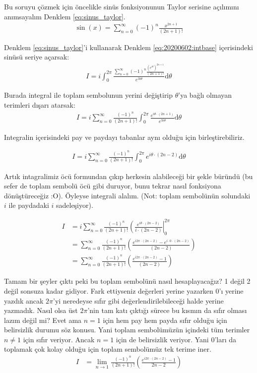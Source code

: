 \documentclass{article}
\numberwithin{equation}{section}
\begin{document}
Bu soruyu çözmek için öncelikle sinüs fonksiyonunun Taylor serisine açılımını anımsayalım Denklem \eqref{eq:sinus_taylor}.
%
\begin{align}
\label{eq:sinus_taylor}
	\sin(x) = \sum_{n=0}^{\infty} (-1)^n \frac{x^{2n+1}}{(2n+1)!}
\end{align}

Denklem \eqref{eq:sinus_taylor}'i kullanarak Denklem \eqref{eq:20200602:intbase} içerisindeki sinüsü seriye açarsak: 
%
\begin{align}
 I = i\int_0^{2\pi} \frac{\sum_{n=0}^{\infty} (-1)^n \frac{(e^{i\theta} )^{2n+1}}{(2n+1)!}}{e^{3i\theta}}  \mathrm{d}\theta
\end{align} 

Burada integral ile toplam sembolunun yerini değiştirip $\theta$'ya bağlı olmayan terimleri dışarı atarsak: 
\begin{align}
I = i \sum_{n=0}^{\infty} \frac{(-1)^n}{(2n+1)!}  \int_0^{2\pi} \frac{ e^{i\theta\cdot (2n+1)} }{e^{3i\theta}}  \mathrm{d}\theta
\end{align} 

Integralin içerisindeki pay ve paydayı tabanlar aynı olduğu için birleştirebiliriz.

\begin{align}
I = i \sum_{n=0}^{\infty} \frac{(-1)^n}{(2n+1)!}  \int_0^{2\pi} e^{i\theta\cdot (2n-2)}  \mathrm{d}\theta
\end{align} 

Artık intagralimiz öcü formundan çıkıp herkesin alabileceği bir şekle büründü (bu sefer de toplam sembolü öcü gibi duruyor, bunu tekrar nasıl fonksiyona dönüştüreceğiz :O). Öyleyse integrali alalım. (Not: toplam sembolünün solundaki $i$ ile paydadaki $i$ sadeleşiyor).

\begin{align}
I &= i\sum_{n=0}^{\infty} \frac{(-1)^n}{(2n+1)!} \left( \frac{ e^{i\theta\cdot (2n-2)}  }{i\cdot (2n-2)}\right|_0^{2\pi} \nonumber \\
&= \sum_{n=0}^{\infty} \frac{(-1)^n}{(2n+1)!} \left( \frac{ e^{i2\pi\cdot (2n-2)} -  e^{i\cdot  0\cdot (2n-2)}  }{(2n-2)}\right) \nonumber \\
&= \sum_{n=0}^{\infty} \frac{(-1)^n}{(2n+1)!} \left( \frac{ e^{i2\pi\cdot (2n-2)} -  1  }{(2n-2)}\right)
\end{align} 

Tamam bir şeyler çıktı peki bu toplam sembolünü nasıl hesaplayacağız? 1 değil 2 değil sonsuza kadar gidiyor. Fark ettiyseniz değerleri yerine yazarken 0'ı yerine yazdık ancak $2\pi$'yi neredeyse sıfır gibi değerlendirilebileceği halde yerine yazmadık. Nasıl olsa üst $2\pi$'nin tam katı çıktığı sürece bu kısmın da sıfır olması lazım değil mi? Evet ama $n=1$ için hem pay hem payda sıfır olduğu için belirsizlik durumu söz konusu. Yani toplam sembolümüzün içindeki tüm terimler $n\neq 1$ için sıfır veriyor. Ancak $n=1$ için de belirsizlik veriyor. Yani 0'ları da toplamak çok kolay olduğu için toplam sembolümüz tek terime iner. 
\begin{align}
I&= \lim_{n \to 1} \frac{(-1)^n}{(2n+1)!} \left( \frac{ e^{i2\pi\cdot (2n-2)} -  1  }{ 2n-2}\right)
\end{align} 
\end{document}
